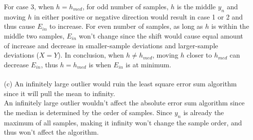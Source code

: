 \documentclass[12pt]{article}
\begin{document}
For case 3, when $h=h_{med}$, for odd number of samples, $h$ is the middle $y_n$ and moving $h$ in either positive or negative direction would result in case 1 or 2 and thus cause $E_{in}$ to increase. For even number of samples, as long as $h$ is within the middle two samples, $E_{in}$ won't change since the shift would cause equal amount of increase and decrease in smaller-sample deviations and larger-sample deviations ($X=Y$). In conclusion, when $h\neq h_{med}$, moving $h$ closer to $h_{med}$ can decrease $E_{in}$, thus $h=h_{med}$ is when $E_{in}$ is at minimum.\\\\ 
(c)
An infinitely large outlier would ruin the least square error sum algorithm since it will pull the mean to infinity.\\
An infinitely large outlier wouldn't affect the absolute error sum algorithm since the median is determined by the order of samples. Since $y_n$ is already the maximum of all samples, making it infinity won't change the sample order, and thus won't affect the algorithm. \\
\end{document}
